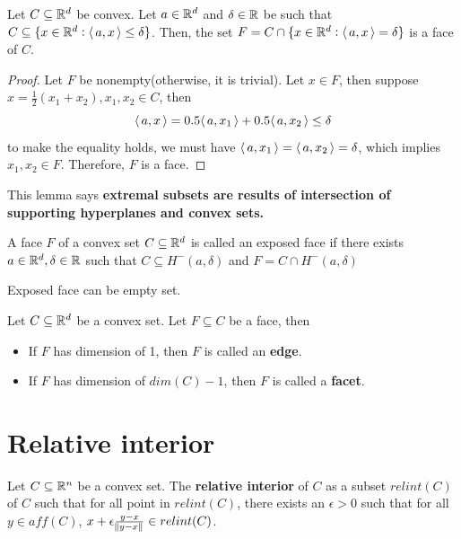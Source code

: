 \begin{refsection}
\begin{lemma}
Let $C \subseteq \mathbb{R}^d$ be convex. Let $a\in \mathbb{R}^d$ and $\delta \in \mathbb{R}$ be such that $C\subseteq \{x\in \mathbb{R}^d:{\left< \, a,x \, \right>}\leq \delta \}$. Then, the set $F = C\cap \{x\in \mathbb{R}^d:{\left< \, a,x \, \right>}=\delta\} $ is a face of $C$.
\end{lemma}
\begin{proof}
Let $F$ be nonempty(otherwise, it is trivial). Let $x\in F$, then suppose $x = \frac{1}{2}(x_1+x_2),x_1,x_2 \in C$, then
$${\left< \, a,x \, \right>}=0.5 {\left< \, a,x_1 \, \right>} + 0.5{\left< \, a,x_2 \, \right>} \leq \delta$$
to make the equality holds, we must have ${\left< \, a,x_1 \, \right>} = {\left< \, a,x_2 \, \right>} = \delta$, which implies $x_1,x_2\in F$.
Therefore, $F$ is a face. 
\end{proof}

\begin{remark}
	This lemma says \textbf{extremal subsets are results of intersection of supporting hyperplanes and convex sets.}
\end{remark}


\begin{definition}
A face $F$ of a convex set $C\subseteq \mathbb{R}^d$ is called an exposed face if there exists $a\in \mathbb{R}^d,\delta \in \mathbb{R}$ such that $C\subseteq H^-(a,\delta)$ and $F = C\cap H^-(a,\delta)$
\end{definition}

\begin{remark}
	Exposed face can be empty set.
\end{remark}

\begin{definition}
Let $C\subseteq \mathbb{R}^d$ be a convex set. Let $F\subseteq C$ be a face, then 
\begin{itemize}
	\item If $F$ has dimension of 1, then $F$ is called an \textbf{edge}.
	\item If $F$ has dimension of $dim(C)-1$, then $F$ is called a \textbf{facet}.
\end{itemize} 
\end{definition}

\section{Relative interior}

\begin{definition}
	Let $C\subseteq \mathbb{R}^n$ be a convex set. The \textbf{relative interior} of $C$ as a subset $relint(C)$ of $C$ such that for all point in $relint(C)$, there exists an $\epsilon > 0$ such that for all $y \in aff(C)$, $x + \epsilon \frac{y-x}{\norm{y-x}} \in relint(C)$.
\end{definition}


\end{refsection}
